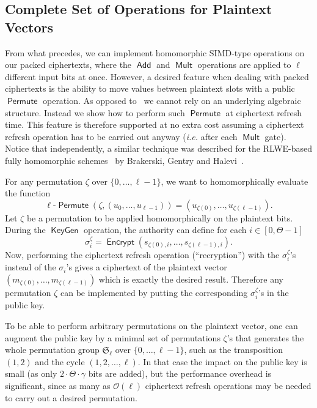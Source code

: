 \documentclass[11pt]{llncs}
\newcommand{\ie}{\textsl{i.e.}\xspace}
\DeclareMathOperator{\KeyGen}{\ensuremath{\mathsf{KeyGen}}}
\DeclareMathOperator{\Encrypt}{\ensuremath{\mathsf{Encrypt}}}
\DeclareMathOperator{\Add}{\ensuremath{\mathsf{Add}}}
\DeclareMathOperator{\Mult}{\ensuremath{\mathsf{Mult}}}
\DeclareMathOperator{\Permute}{\ensuremath{\mathsf{Permute}}}
\renewcommand*\O{\ensuremath{\mathcal O}}
\begin{document}
\subsection{Complete Set of Operations for Plaintext Vectors}\label{subsec:permutations}

From what precedes, we can implement homomorphic SIMD-type operations on
our packed ciphertexts, where the $\Add$ and $\Mult$ operations are
applied to $\ell$ different input bits at once. However, a desired
feature when dealing with packed ciphertexts is the ability to move
values between plaintext slots with a public $\Permute$ operation. As opposed to~\cite{GHS2012a} we cannot rely on an underlying algebraic structure.
Instead we show how to perform  such $\Permute$ at ciphertext refresh time.
This feature is therefore supported at no extra cost assuming a
ciphertext refresh operation has to be carried out anyway (\ie after each
$\Mult$ gate). Notice that independently, a similar technique was described 
for the RLWE-based fully homomorphic schemes~\cite{BV2011a,BV2011b,GHS2012a}
by Brakerski, Gentry and Halevi~\cite{BGH2013}.

\smallskip
For any permutation $\zeta$ over $\{0,\ldots,{\ell-1}\}$, we want to homomorphically evaluate the function
\[ \text{$\ell$-$\Permute$}\left(\zeta,\left(u_0,\ldots,u_{\ell-1}\right)\right) = \left(u_{\zeta(0)},\ldots,u_{\zeta({\ell-1})}\right). \]
Let $\zeta$ be a permutation to be applied  homomorphically on the plaintext bits. During the $\KeyGen$ operation, the authority can define for each $i\in[0,\Theta-1]$
\[ \sigma_{i}^{\zeta} = \Encrypt(s_{\zeta(0),i},\ldots,s_{\zeta(\ell-1),i}). \]
Now, performing the ciphertext refresh operation (``recryption'') with the $\sigma_i^\zeta$'s instead of the $\sigma_i$'s gives a ciphertext of the plaintext vector
$(m_{\zeta(0)},\ldots,m_{\zeta(\ell-1)})$
which is exactly the desired result. Therefore any permutation $\zeta$
can be implemented by putting the corresponding $\sigma^\zeta_i$'s in the public key.

To be able to perform arbitrary permutations on the plaintext vector, one
can augment the public key by a minimal set of permutations $\zeta$'s
that generates the whole permutation group $\mathfrak S_\ell$ over $\{0,\ldots,\ell-1\}$, such as
the transposition $(1,2)$ and the cycle $(1,2,\ldots,\ell)$. In that case
the impact on the public key is small (as only $2\cdot \Theta\cdot
\gamma$ bits are added), but the performance overhead is significant,
since as many as $\O(\ell)$ ciphertext refresh operations may be needed to
carry out a desired permutation.
\end{document}
